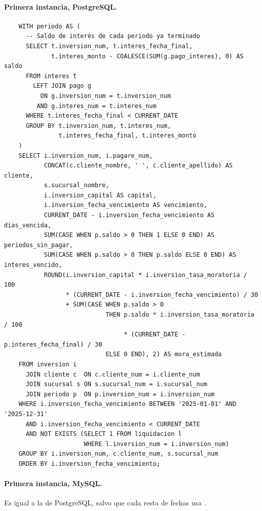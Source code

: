 \paragraph{Primera instancia, PostgreSQL.}

\begin{verbatim}
	WITH periodo AS (
	  -- Saldo de interés de cada periodo ya terminado
	  SELECT t.inversion_num, t.interes_fecha_final,
	         t.interes_monto - COALESCE(SUM(g.pago_interes), 0) AS saldo
	  FROM interes t
	    LEFT JOIN pago g
	      ON g.inversion_num = t.inversion_num
	     AND g.interes_num = t.interes_num
	  WHERE t.interes_fecha_final < CURRENT_DATE
	  GROUP BY t.inversion_num, t.interes_num,
	           t.interes_fecha_final, t.interes_monto
	)
	SELECT i.inversion_num, i.pagare_num,
	       CONCAT(c.cliente_nombre, ' ', c.cliente_apellido) AS cliente,
	       s.sucursal_nombre,
	       i.inversion_capital AS capital,
	       i.inversion_fecha_vencimiento AS vencimiento,
	       CURRENT_DATE - i.inversion_fecha_vencimiento AS dias_vencida,
	       SUM(CASE WHEN p.saldo > 0 THEN 1 ELSE 0 END) AS periodos_sin_pagar,
	       SUM(CASE WHEN p.saldo > 0 THEN p.saldo ELSE 0 END) AS interes_vencido,
	       ROUND(i.inversion_capital * i.inversion_tasa_moratoria / 100
	             * (CURRENT_DATE - i.inversion_fecha_vencimiento) / 30
	             + SUM(CASE WHEN p.saldo > 0
	                        THEN p.saldo * i.inversion_tasa_moratoria / 100
	                             * (CURRENT_DATE - p.interes_fecha_final) / 30
	                        ELSE 0 END), 2) AS mora_estimada
	FROM inversion i
	  JOIN cliente c  ON c.cliente_num = i.cliente_num
	  JOIN sucursal s ON s.sucursal_num = i.sucursal_num
	  JOIN periodo p  ON p.inversion_num = i.inversion_num
	WHERE i.inversion_fecha_vencimiento BETWEEN '2025-01-01' AND '2025-12-31'
	  AND i.inversion_fecha_vencimiento < CURRENT_DATE
	  AND NOT EXISTS (SELECT 1 FROM liquidacion l
	                  WHERE l.inversion_num = i.inversion_num)
	GROUP BY i.inversion_num, c.cliente_num, s.sucursal_num
	ORDER BY i.inversion_fecha_vencimiento;
\end{verbatim}

\paragraph{Primera instancia, MySQL.} Es igual a la de PostgreSQL, salvo que cada resta de fechas usa .

